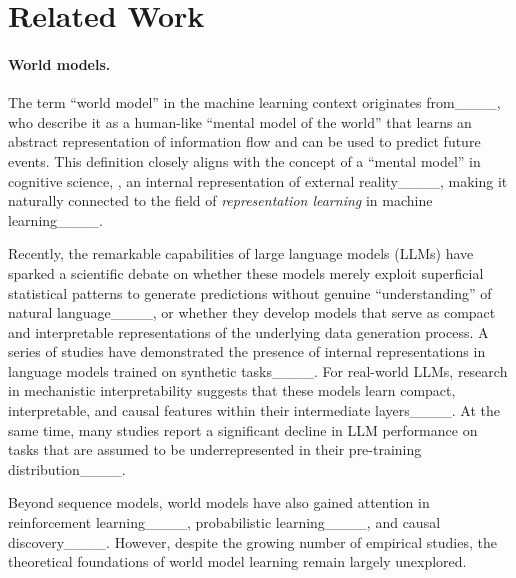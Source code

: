 \section{Related Work}
\label{appsec:related_work}

\paragraph{World models.} 
The term “world model” in the machine learning context originates from____, who describe it as a human-like “mental model of the world” that learns an abstract representation of information flow and can be used to predict future events. This definition closely aligns with the concept of a “mental model” in cognitive science, \ie, an internal representation of external reality____, making it naturally connected to the field of \emph{representation learning} in machine learning____.

Recently, the remarkable capabilities of large language models (LLMs) have sparked a scientific debate on whether these models merely exploit superficial statistical patterns to generate predictions without genuine “understanding” of natural language____, or whether they develop models that serve as compact and interpretable representations of the underlying data generation process. A series of studies have demonstrated the presence of internal representations in language models trained on synthetic tasks____. For real-world LLMs, research in mechanistic interpretability suggests that these models learn compact, interpretable, and causal features within their intermediate layers____. At the same time, many studies report a significant decline in LLM performance on tasks that are assumed to be underrepresented in their pre-training distribution____.

Beyond sequence models, world models have also gained attention in reinforcement learning____, probabilistic learning____, and causal discovery____. However, despite the growing number of empirical studies, the theoretical foundations of world model learning remain largely unexplored.

